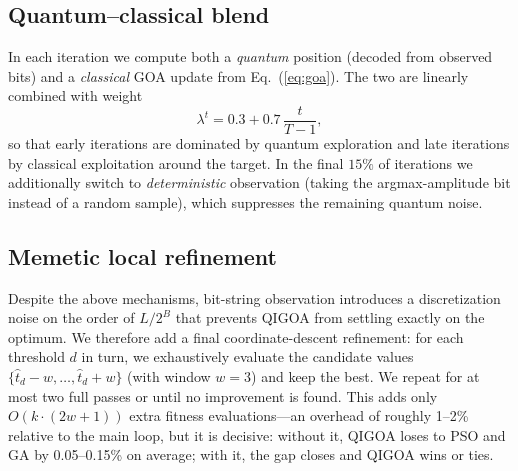 \subsection{Quantum--classical blend}

In each iteration we compute both a \emph{quantum} position (decoded from observed bits) and a \emph{classical} GOA update from Eq.~(\ref{eq:goa}). The two are linearly combined with weight
\begin{equation}\label{eq:blend}
\lambda^t = 0.3 + 0.7\,\frac{t}{T-1},
\end{equation}
so that early iterations are dominated by quantum exploration and late iterations by classical exploitation around the target. In the final $15\%$ of iterations we additionally switch to \emph{deterministic} observation (taking the argmax-amplitude bit instead of a random sample), which suppresses the remaining quantum noise.

\subsection{Memetic local refinement}

Despite the above mechanisms, bit-string observation introduces a discretization noise on the order of $L/2^B$ that prevents QIGOA from settling exactly on the optimum. We therefore add a final coordinate-descent refinement: for each threshold $d$ in turn, we exhaustively evaluate the candidate values $\{\hat{t}_d - w,\dots,\hat{t}_d + w\}$ (with window $w{=}3$) and keep the best. We repeat for at most two full passes or until no improvement is found. This adds only $O(k\cdot(2w{+}1))$ extra fitness evaluations---an overhead of roughly 1--2\% relative to the main loop, but it is decisive: without it, QIGOA loses to PSO and GA by 0.05--0.15\% on average; with it, the gap closes and QIGOA wins or ties.

